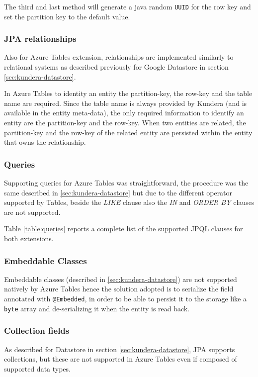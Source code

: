 \noindent The third and last method will generate a java random \texttt{UUID} for the row key and set the partition key to the default value.

\subsubsection{JPA relationships}
Also for Azure Tables extension, relationships are implemented similarly to relational systems as described previously for Google Datastore in section \ref{sec:kundera-datastore}.

\noindent In Azure Tables to identity an entity the partition-key, the row-key and the table name are required. Since the table name is always provided by Kundera (and is available in the entity meta-data), the only required information to identify an entity are the partition-key and the row-key.
When two entities are related, the partition-key and the row-key of the related entity are persisted within the entity that owns the relationship.

\subsubsection{Queries}
Supporting queries for Azure Tables was straightforward, the procedure was the same described in \ref{sec:kundera-datastore} but due to the different operator supported by Tables, beside the \textit{LIKE} clause also the \textit{IN} and \textit{ORDER BY} clauses are not supported.

\noindent Table \ref{table:queries} reports a complete list of the supported JPQL clauses for both extensions.

\subsubsection{Embeddable Classes}
Embeddable classes (described in \ref{sec:kundera-datastore}) are not supported natively by Azure Tables hence the solution adopted is to serialize the field annotated with \texttt{@Embedded}, in order to be able to persist it to the storage like a \texttt{byte} array and de-serializing it when the entity is read back.

\subsubsection{Collection fields}
As described for Datastore in section \ref{sec:kundera-datastore}, JPA supports collections, but these are not supported in Azure Tables even if composed of supported data types.

